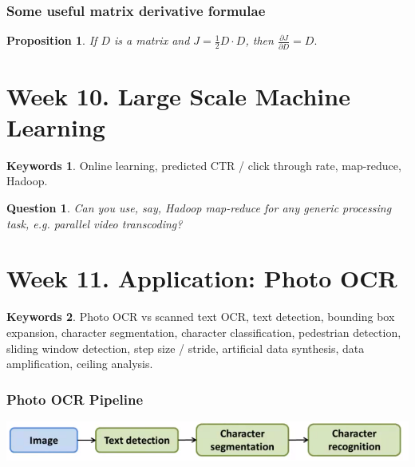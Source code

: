 \documentclass[12pt]{article}
\theoremstyle{plain}
\newtheorem{proposition}[theorem]{Proposition}
\newtheorem{question}[theorem]{Question}
\theoremstyle{definition}
\newtheorem*{keywords}{Keywords}
\theoremstyle{remark}
\begin{document}
\section{Some useful matrix derivative formulae}

\begin{proposition}
If $D$ is a matrix and $J = \frac{1}{2} D \cdot D$, then $\frac{\partial J}{\partial D} = D.$
\end{proposition}

\part{Week 10. Large Scale Machine Learning}

\begin{keywords}
Online learning, predicted CTR / click through rate, map-reduce, Hadoop.
\end{keywords}

\begin{question}
Can you use, say, Hadoop map-reduce for any generic processing task, e.g. parallel video transcoding?
\end{question}

\part{Week 11. Application: Photo OCR}

\begin{keywords}
Photo OCR vs scanned text OCR, text detection, bounding box expansion, character segmentation, character classification, pedestrian detection, sliding window detection, step size / stride, artificial data synthesis, data amplification, ceiling analysis.
\end{keywords}

\section{Photo OCR Pipeline}

\centerline{\includegraphics[width=1.0\textwidth]{ocrpipeline}}
\end{document}

